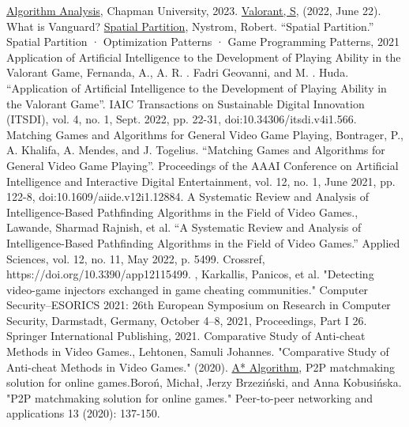 \documentclass{article}
\theoremstyle{theorem}
\theoremstyle{definition}
\theoremstyle{remark}
\begin{document}
\begin{thebibliography}{99}
 \href{https://github.com/alexhkurz/algorithm-analysis-2023}{Algorithm Analysis}, Chapman University, 2023.
 \href{https://support-valorant.riotgames.com/hc/en-us/articles/360046160933-What-is-Vanguard-}{Valorant, S},  (2022, June 22). What is Vanguard?
 \href{gameprogrammingpatterns.com/spatial-partition.html}{Spatial Partition}, Nystrom, Robert. “Spatial Partition.” Spatial Partition · Optimization Patterns · Game Programming Patterns, 2021
 {Application of Artificial Intelligence to the Development of Playing Ability in the Valorant Game}, Fernanda, A., A. R. . Fadri Geovanni, and M. . Huda. “Application of Artificial Intelligence to the Development of Playing Ability in the Valorant Game”. IAIC Transactions on Sustainable Digital Innovation (ITSDI), vol. 4, no. 1, Sept. 2022, pp. 22-31, doi:10.34306/itsdi.v4i1.566.
 {Matching Games and Algorithms for General Video Game Playing}, Bontrager, P., A. Khalifa, A. Mendes, and J. Togelius. “Matching Games and Algorithms for General Video Game Playing”. Proceedings of the AAAI Conference on Artificial Intelligence and Interactive Digital Entertainment, vol. 12, no. 1, June 2021, pp. 122-8, doi:10.1609/aiide.v12i1.12884.
 {A Systematic Review and Analysis of Intelligence-Based Pathfinding Algorithms in the Field of Video Games.}, Lawande, Sharmad Rajnish, et al. “A Systematic Review and Analysis of Intelligence-Based Pathfinding Algorithms in the Field of Video Games.” Applied Sciences, vol. 12, no. 11, May 2022, p. 5499. Crossref, https://doi.org/10.3390/app12115499.
, Karkallis, Panicos, et al. "Detecting video-game injectors exchanged in game cheating communities." Computer Security–ESORICS 2021: 26th European Symposium on Research in Computer Security, Darmstadt, Germany, October 4–8, 2021, Proceedings, Part I 26. Springer International Publishing, 2021.
 {Comparative Study of Anti-cheat Methods in Video Games.}, Lehtonen, Samuli Johannes. "Comparative Study of Anti-cheat Methods in Video Games." (2020).
 \href{https://www.geeksforgeeks.org/a-search-algorithm/#}{A* Algorithm},
 {P2P matchmaking solution for online games.}Boroń, Michał, Jerzy Brzeziński, and Anna Kobusińska. "P2P matchmaking solution for online games." Peer-to-peer networking and applications 13 (2020): 137-150.
\end{thebibliography}
\end{document}
